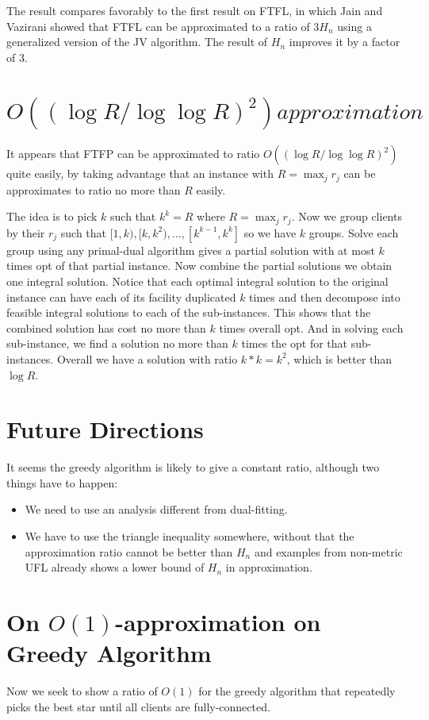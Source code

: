 \documentclass{article}
\begin{document}
The result compares favorably to the first result on FTFL, in which
Jain and Vazirani showed that FTFL can be approximated to a ratio of
$3H_n$ using a generalized version of the JV algorithm. The result of
$H_n$ improves it by a factor of $3$.

\section{$O((\log R/\log\log R)^2) approximation$}
It appears that FTFP can be approximated to ratio $O((\log R / \log\log
R)^2)$ quite easily, by taking advantage that an instance with $R =
\max_j r_j$ can be approximates to ratio no more than $R$ easily.

The idea is to pick $k$ such that $k^k = R$ where $R = \max_j
r_j$. Now we group clients by their $r_j$ such that $[1,k), [k,k^2),
\ldots, [k^{k-1}, k^k]$ so we have $k$ groups. Solve each group using
any primal-dual algorithm gives a partial solution with at most $k$
times opt of that partial instance. Now combine the partial solutions
we obtain one integral solution. Notice that each optimal integral
solution to the original instance can have each of its facility
duplicated $k$ times and then decompose into feasible integral
solutions to each of the sub-instances. This shows that the combined
solution has cost no more than $k$ times overall opt. And in solving
each sub-instance, we find a solution no more than $k$ times the opt
for that sub-instances. Overall we have a solution with ratio $k*k =
k^2$, which is better than $\log R$.

\section{Future Directions}
It seems the greedy algorithm is likely to give a constant ratio,
although two things have to happen:
\begin{itemize}
\item We need to use an analysis different from dual-fitting.
\item We have to use the triangle inequality somewhere, without that
  the approximation ratio cannot be better than $H_n$ and examples
  from non-metric UFL already shows a lower bound of $H_n$ in approximation.
\end{itemize}

\section{On $O(1)$-approximation on Greedy Algorithm}
Now we seek to show a ratio of $O(1)$ for the greedy algorithm that
repeatedly picks the best star until all clients are fully-connected.
\end{document}
